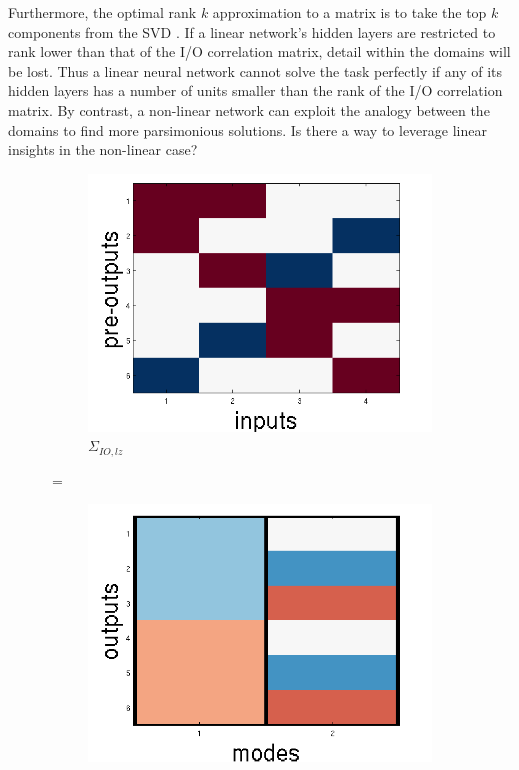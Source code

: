 \documentclass[10pt,letterpaper]{article}
\begin{document}
Furthermore, the optimal rank $k$ approximation to a matrix is to take the top $k$ components from the SVD \citep{Mirsky1960}. If a linear network's hidden layers are restricted to rank lower than that of the I/O correlation matrix, detail within the domains will be lost. Thus a linear neural network cannot solve the task perfectly if any of its hidden layers has a number of units smaller than the rank of the I/O correlation matrix. By contrast, a non-linear network can exploit the analogy between the domains to find more parsimonious solutions. Is there a way to leverage linear insights in the non-linear case?  
\begin{figure}
\centering
\begin{subfigure}{0.22\textwidth}
\includegraphics[width=\textwidth]{figures/linearized_IO.png}
\caption{$\Sigma_{IO,lz}$}
\end{subfigure}
\huge{$=$}
\begin{subfigure}{0.22\textwidth}
\includegraphics[width=\textwidth]{figures/U_lz.png}

\end{subfigure}
\end{figure}
\end{document}
